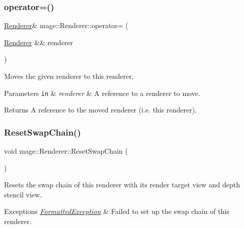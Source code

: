 \subsubsection{\texorpdfstring{operator=()}{operator=()}\hspace{0.1cm}{\footnotesize\ttfamily [2/2]}}
{\footnotesize\ttfamily \hyperlink{classmage_1_1_renderer}{Renderer}\& mage\+::\+Renderer\+::operator= (\begin{DoxyParamCaption}\item[{\hyperlink{classmage_1_1_renderer}{Renderer} \&\&}]{renderer }\end{DoxyParamCaption})\hspace{0.3cm}{\ttfamily [delete]}}

Moves the given renderer to this renderer.


\begin{DoxyParams}[1]{Parameters}
\mbox{\tt in}  & {\em renderer} & A reference to a renderer to move. \\
\hline
\end{DoxyParams}
\begin{DoxyReturn}{Returns}
A reference to the moved renderer (i.\+e. this renderer). 
\end{DoxyReturn}
\hypertarget{classmage_1_1_renderer_a1c4615559503b339a9cdc6ac17e1e858}{}\label{classmage_1_1_renderer_a1c4615559503b339a9cdc6ac17e1e858} 
\subsubsection{\texorpdfstring{Reset\+Swap\+Chain()}{ResetSwapChain()}}
{\footnotesize\ttfamily void mage\+::\+Renderer\+::\+Reset\+Swap\+Chain (\begin{DoxyParamCaption}{ }\end{DoxyParamCaption})\hspace{0.3cm}{\ttfamily [private]}}

Resets the swap chain of this renderer with its render target view and depth stencil view.


\begin{DoxyExceptions}{Exceptions}
{\em \hyperlink{structmage_1_1_formatted_exception}{Formatted\+Exception}} & Failed to set up the swap chain of this renderer. \\
\hline
\end{DoxyExceptions}
\hypertarget{classmage_1_1_renderer_aff4e08af2ab697c53f1ede6546a86d19}{}\label{classmage_1_1_renderer_aff4e08af2ab697c53f1ede6546a86d19} 
